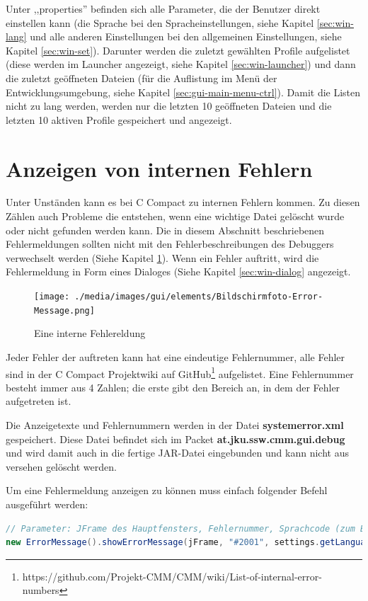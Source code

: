 Unter ,,properties'' befinden sich alle Parameter, die der Benutzer direkt einstellen kann (die Sprache bei den Spracheinstellungen, siehe Kapitel \ref{sec:win-lang} und alle anderen Einstellungen bei den allgemeinen Einstellungen, siehe Kapitel \ref{sec:win-set}). Darunter werden die zuletzt gewählten Profile aufgelistet (diese werden im Launcher angezeigt, siehe Kapitel \ref{sec:win-launcher}) und dann die zuletzt geöffneten Dateien (für die Auflistung im Menü der Entwicklungsumgebung, siehe Kapitel \ref{sec:gui-main-menu-ctrl}). Damit die Listen nicht zu lang werden, werden nur die letzten 10 geöffneten Dateien und die letzten 10 aktiven Profile gespeichert und angezeigt.

\section{Anzeigen von internen Fehlern}
Unter Unständen kann es bei C Compact zu internen Fehlern kommen. Zu diesen Zählen auch Probleme die entstehen, wenn eine wichtige Datei gelöscht wurde oder nicht gefunden werden kann. Die in diesem Abschnitt beschriebenen Fehlermeldungen sollten nicht mit den Fehlerbeschreibungen des Debuggers verwechselt werden (Siehe Kapitel \ref{}). Wenn ein Fehler auftritt, wird die Fehlermeldung in Form eines Dialoges (Siehe Kapitel \ref{sec:win-dialog} angezeigt.

\begin{figure}[htp]
\centering
\texttt{[image: ./media/images/gui/elements/Bildschirmfoto-Error-Message.png]}
\caption{Eine interne Fehlereldung}
\end{figure}

Jeder Fehler der auftreten kann hat eine eindeutige Fehlernummer, alle Fehler sind in der C Compact Projektwiki auf GitHub\footnote{https://github.com/Projekt-CMM/CMM/wiki/List-of-internal-error-numbers} aufgelistet. Eine Fehlernummer besteht immer aus 4 Zahlen; die erste gibt den Bereich an, in dem der Fehler aufgetreten ist.

Die Anzeigetexte und Fehlernummern werden in der Datei \textbf{systemerror.xml} gespeichert. Diese Datei befindet sich im Packet \textbf{at.jku.ssw.cmm.gui.debug} und wird damit auch in die fertige JAR-Datei eingebunden und kann nicht aus versehen gelöscht werden.

Um eine Fehlermeldung anzeigen zu können muss einfach folgender Befehl ausgeführt werden:
\begin{lstlisting}[language=JAVA]
// Parameter: JFrame des Hauptfensters, Fehlernummer, Sprachcode (zum Beispiel "de" oder "en")
new ErrorMessage().showErrorMessage(jFrame, "#2001", settings.getLanguage());
\end{lstlisting}

